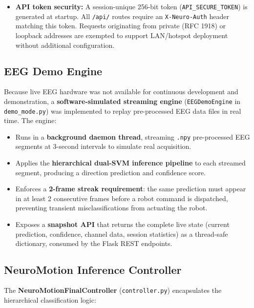 \documentclass[12pt, a4paper, oneside]{report}
\begin{document}
\begin{description}
\begin{itemize}
  \item \textbf{API token security:} A session-unique 256-bit token
        (\texttt{API\_SECURE\_TOKEN}) is generated at startup. All \texttt{/api/}
        routes require an \texttt{X-Neuro-Auth} header matching this token.
        Requests originating from private (RFC 1918) or loopback addresses are
        exempted to support LAN/hotspot deployment without additional configuration.
\end{itemize}

\subsection{EEG Demo Engine}

Because live EEG hardware was not available for continuous development and demonstration,
a \textbf{software-simulated streaming engine} (\texttt{EEGDemoEngine} in
\texttt{demo\_mode.py}) was implemented to replay pre-processed EEG data files in
real time. The engine:

\begin{itemize}
  \item Runs in a \textbf{background daemon thread}, streaming \texttt{.npy}
        pre-processed EEG segments at 3-second intervals to simulate real acquisition.
  \item Applies the \textbf{hierarchical dual-SVM inference pipeline} to each
        streamed segment, producing a direction prediction and confidence score.
  \item Enforces a \textbf{2-frame streak requirement}: the same prediction must
        appear in at least 2 consecutive frames before a robot command is dispatched,
        preventing transient misclassifications from actuating the robot.
  \item Exposes a \textbf{snapshot API} that returns the complete live state
        (current prediction, confidence, channel data, session statistics) as a
        thread-safe dictionary, consumed by the Flask REST endpoints.
\end{itemize}

\subsection{NeuroMotion Inference Controller}

The \textbf{NeuroMotionFinalController} (\texttt{controller.py}) encapsulates the
hierarchical classification logic:


\end{description}
\end{document}
